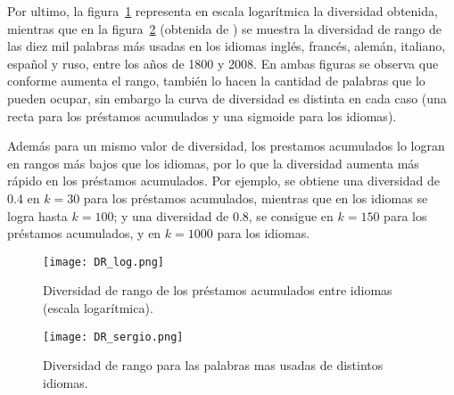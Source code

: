 Por ultimo, la figura~\ref{fig.DR_log} representa en escala logarítmica la diversidad obtenida, mientras que en la figura~\ref{fig.DR_sergio} (obtenida de \cite{tesis.sergio}) se muestra la diversidad de rango de las diez mil palabras más usadas en los idiomas inglés, francés, alemán, italiano, español y ruso,  entre los años de 1800 y 2008. En ambas figuras se observa que conforme aumenta el rango, también lo hacen la cantidad de palabras que lo pueden ocupar, sin embargo la curva de diversidad es distinta en cada caso (una recta para los préstamos acumulados y una sigmoide para los idiomas).  

Además para un mismo valor de diversidad,  los prestamos acumulados lo logran en rangos más bajos que los idiomas, por lo que la diversidad aumenta más rápido en los préstamos acumulados. Por ejemplo, se obtiene una diversidad de 0.4 en $k=30$ para los préstamos acumulados, mientras que en los idiomas se logra hasta $k=100$;  y una diversidad de 0.8, se consigue en $k=150$ para los préstamos acumulados, y en $k=1000$ para los idiomas. 




\begin{figure}[h!]
	\centering
	\texttt{[image: DR\_log.png]}
	\caption{Diversidad de rango de los préstamos acumulados entre idiomas (escala logarítmica).}
	\label{fig.DR_log} 
\end{figure}

\begin{figure}[h!]
	\centering
	\texttt{[image: DR\_sergio.png]}
	\caption{Diversidad de rango para las palabras mas usadas de distintos idiomas. }
	\label{fig.DR_sergio} 
\end{figure}

